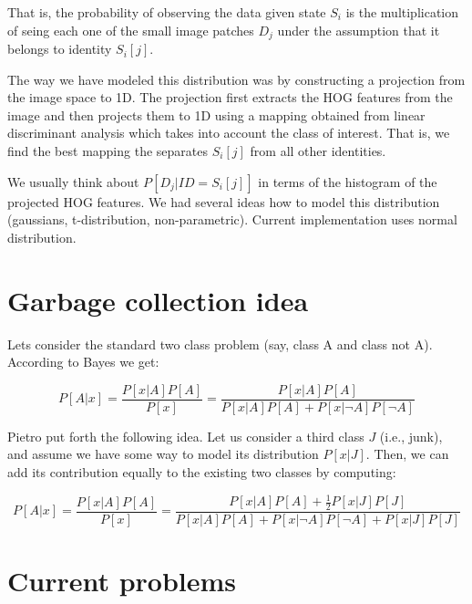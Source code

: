 \documentclass[12pt]{article}
\begin{document}
That is, the probability of observing the data given state $S_i$ is the multiplication of seing each one of the small image patches $D_j$ under the assumption that it belongs to identity ${S_i}\left[ j \right]$.

The way we have modeled this distribution was by constructing a projection from the image space to 1D. The projection first extracts the HOG features from the image and then projects them to 1D using a mapping obtained from linear discriminant analysis which takes into account the class of interest. That is, we find the best mapping the separates ${S_i}\left[ j \right]$ from all other identities.

We usually think about $P\left[ {{D_j}|ID = {S_i}[j]} \right]$ in terms of the histogram of the projected HOG features. We had several ideas how to model this distribution (gaussians, t-distribution, non-parametric). Current implementation uses normal distribution.


\section{Garbage collection idea}
Lets consider the standard two class problem (say, class A and class not A). According to Bayes we get:

\begin{equation}
\label{Eq3}
P\left[ {A|x} \right] = \frac{{P\left[ {x|A} \right]P\left[ A \right]}}{{P\left[ x \right]}} = \frac{{P\left[ {x|A} \right]P\left[ A \right]}}{{P\left[ {x|A} \right]P\left[ A \right] + P\left[ {x|\neg A} \right]P\left[ {\neg A} \right]}}
\end{equation}

Pietro put forth the following idea. Let us consider a third class $J$ (i.e., junk), and assume we have some way to model its distribution $P\left[ {x|J} \right]$. Then, we can add its contribution equally to the existing two classes by computing:

\begin{equation}
\label{Eq4}
P\left[ {A|x} \right] = \frac{{P\left[ {x|A} \right]P\left[ A \right]}}{{P\left[ x \right]}} = \frac{{P\left[ {x|A} \right]P\left[ A \right] + \frac{1}{2}P\left[ {x|J} \right]P\left[ J \right]}}{{P\left[ {x|A} \right]P\left[ A \right] + P\left[ {x|\neg A} \right]P\left[ {\neg A} \right] + P\left[ {x|J} \right]P\left[ J \right]}}
\end{equation}

\section{Current problems}
\end{document}
